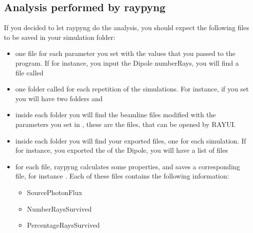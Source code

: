 \documentclass[letterpaper,10pt,english]{sphinxmanual}
\begin{document}
\subsection{Analysis performed by raypyng}
\label{\detokenize{tutorial:analysis-performed-by-raypyng}}
\sphinxAtStartPar
If you decided to let raypyng do the analysis, you should expect the following files to
be saved in your simulation folder:
\begin{itemize}
\item {} 
\sphinxAtStartPar
one file for each parameter you set with the values that you passed to the program.
If for instance, you input the Dipole numberRays, you will find a file called

\item {} 
\sphinxAtStartPar
one folder called  for each repetition of the simulations.
For instance, if you set  you will have two folders  and 

\item {} 
\sphinxAtStartPar
inside each  folder you will find the beamline files modified with the parameters
you set in , these are the  files, that can be opened by RAY\sphinxhyphen{}UI.

\item {} 
\sphinxAtStartPar
inside each  folder you will find your exported files, one for each simulation.
If for instance, you exported the  of the Dipole, you will
have a list of files 

\item {} 
\sphinxAtStartPar
for each  file, raypyng calculates some properties,
and saves a corresponding file, for instance . Each of these files contains the following information:
\begin{itemize}
\item {} 
\sphinxAtStartPar
SourcePhotonFlux

\item {} 
\sphinxAtStartPar
NumberRaysSurvived

\item {} 
\sphinxAtStartPar
PercentageRaysSurvived


\end{itemize}
\end{itemize}
\end{document}
